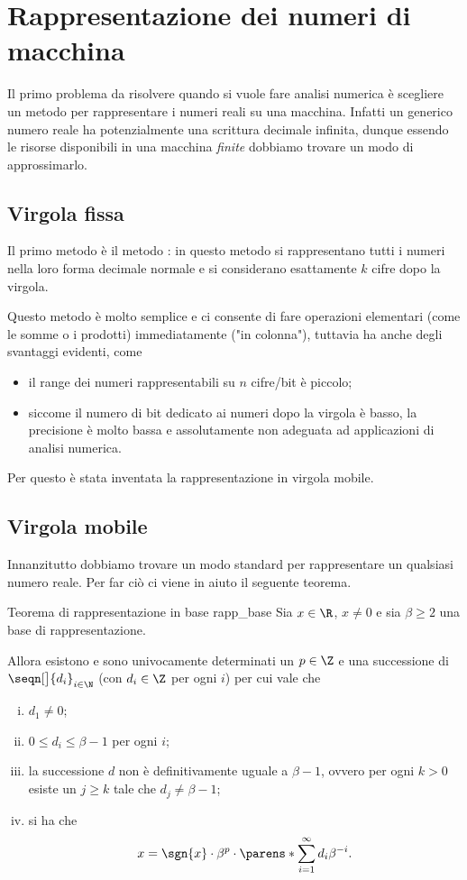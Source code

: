 \section{Rappresentazione dei numeri di macchina}
\label{sez:machine_nums}

Il primo problema da risolvere quando si vuole fare analisi numerica è scegliere un metodo per rappresentare i numeri reali su una macchina. Infatti un generico numero reale ha potenzialmente una scrittura decimale infinita, dunque essendo le risorse disponibili in una macchina \emph{finite} dobbiamo trovare un modo di approssimarlo. 

\subsection{Virgola fissa}
Il primo metodo è il metodo : in questo metodo si rappresentano tutti i numeri nella loro forma decimale normale e si considerano esattamente $k$ cifre dopo la virgola.

Questo metodo è molto semplice e ci consente di fare operazioni elementari (come le somme o i prodotti) immediatamente ("in colonna"), tuttavia ha anche degli svantaggi evidenti, come \begin{itemize}
    \item il range dei numeri rappresentabili su $n$ cifre/bit è piccolo;
    \item siccome il numero di bit dedicato ai numeri dopo la virgola è basso, la precisione è molto bassa e assolutamente non adeguata ad applicazioni di analisi numerica.
\end{itemize}
Per questo è stata inventata la rappresentazione in virgola mobile.

\subsection{Virgola mobile}
Innanzitutto dobbiamo trovare un modo standard per rappresentare un qualsiasi numero reale. Per far ciò ci viene in aiuto il seguente teorema.

\begin{theorem}
    {Teorema di rappresentazione in base}
    {rapp_base}
    Sia $x \in \R$, $x \neq 0$ e sia $\beta \geq 2$ una base di rappresentazione. 
    
    Allora esistono e sono univocamente determinati un  $p \in \Z$ e una successione di  $\seqn[\big]{d_i}_{i \in \N}$ (con $d_i \in \Z$ per ogni $i$) per cui vale che
    \begin{enumerate}[(i)]
        \item $d_1 \neq 0$;
        \item $0 \leq d_i \leq \beta - 1$ per ogni $i$;
        \item la successione $d$ non è definitivamente uguale a $\beta - 1$, ovvero per ogni $k > 0$ esiste un $j \geq k$ tale che $d_j \neq \beta - 1$;
        \item si ha che \[
            x = \sgn{x} \cdot \beta^p \cdot \parens*{\sum_{i=1}^\infty d_i\beta^{-i}}.
        \] 
    \end{enumerate}
\end{theorem}

